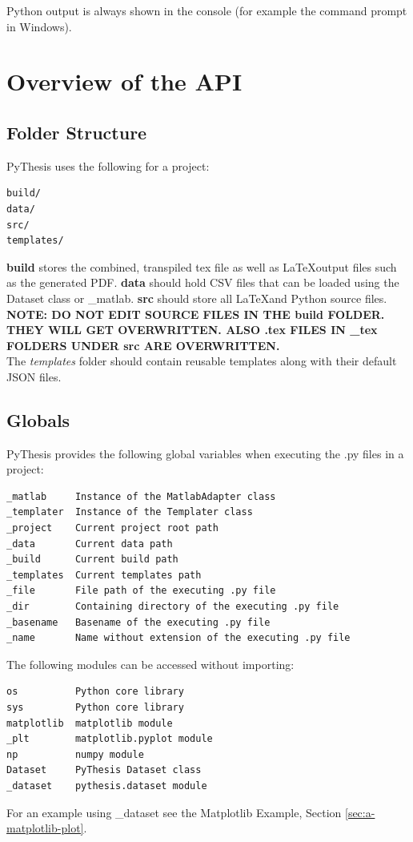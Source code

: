 \documentclass[a4paper]{book}
\begin{document}
Python output is always shown in the console (for example the command prompt in Windows).
\chapter{Overview of the API}
\label{ch:overview-of-the-api}
\section{Folder Structure}
\label{sec:folder-structure}
PyThesis uses the following for a project:
\begin{verbatim}
build/ 
data/
src/
templates/
\end{verbatim}
\textbf{build} stores the combined, transpiled tex file as well as \LaTeX output files such as the generated PDF. \textbf{data} should hold CSV files that can be loaded using the Dataset class or \_matlab. \textbf{src} should store all \LaTeX and Python source files. \\

\textbf{NOTE: DO NOT EDIT SOURCE FILES IN THE build FOLDER. THEY WILL GET OVERWRITTEN. ALSO .tex FILES IN \_tex FOLDERS UNDER src ARE OVERWRITTEN.} \\

The \emph{templates} folder should contain reusable templates along with their default JSON files.
\section{Globals}
\label{sec:globals}
PyThesis provides the following global variables when executing the .py files in a project:
\begin{verbatim}
_matlab     Instance of the MatlabAdapter class
_templater  Instance of the Templater class 
_project    Current project root path
_data       Current data path 
_build      Current build path 
_templates  Current templates path 
_file       File path of the executing .py file 
_dir        Containing directory of the executing .py file 
_basename   Basename of the executing .py file 
_name       Name without extension of the executing .py file 
\end{verbatim}

The following modules can be accessed without importing:
\begin{verbatim}
os          Python core library
sys         Python core library
matplotlib  matplotlib module
_plt        matplotlib.pyplot module
np          numpy module
Dataset     PyThesis Dataset class
_dataset    pythesis.dataset module
\end{verbatim}
For an example using \_dataset see the Matplotlib Example, Section \ref{sec:a-matplotlib-plot}.
\end{document}
